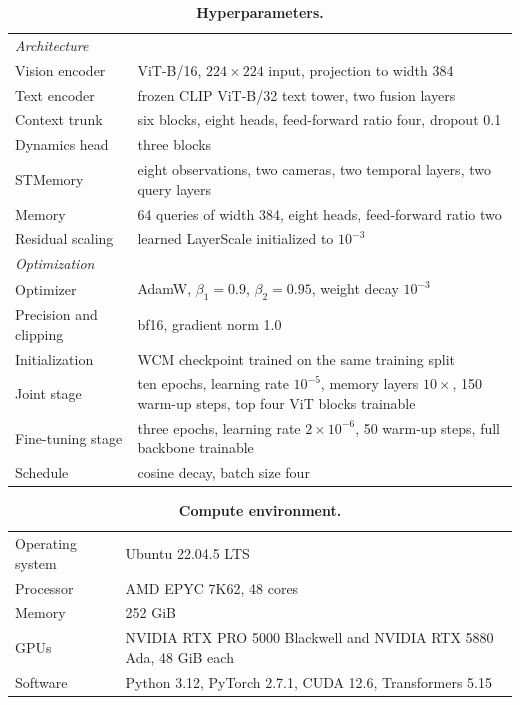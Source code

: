 \documentclass[10pt,a4paper]{article}
\begin{document}
\begin{table}[H]
\centering
\caption{\textbf{Hyperparameters.}}
\label{tab:hyper}
\small
\begin{tabular}{lp{11.2cm}}
\toprule
\multicolumn{2}{l}{\emph{Architecture}} \\
Vision encoder & ViT-B/16, $224\times224$ input, projection to width 384 \\
Text encoder & frozen CLIP ViT-B/32 text tower, two fusion layers \\
Context trunk & six blocks, eight heads, feed-forward ratio four, dropout 0.1 \\
Dynamics head & three blocks \\
STMemory & eight observations, two cameras, two temporal layers, two query layers \\
Memory & 64 queries of width 384, eight heads, feed-forward ratio two \\
Residual scaling & learned LayerScale initialized to $10^{-3}$ \\
\midrule
\multicolumn{2}{l}{\emph{Optimization}} \\
Optimizer & AdamW, $\beta_1=0.9$, $\beta_2=0.95$, weight decay $10^{-3}$ \\
Precision and clipping & bf16, gradient norm 1.0 \\
Initialization & WCM checkpoint trained on the same training split \\
Joint stage & ten epochs, learning rate $10^{-5}$, memory layers $10\times$, 150 warm-up steps, top four ViT blocks trainable \\
Fine-tuning stage & three epochs, learning rate $2\times10^{-6}$, 50 warm-up steps, full backbone trainable \\
Schedule & cosine decay, batch size four \\
\bottomrule
\end{tabular}
\end{table}

\begin{table}[H]
\centering
\caption{\textbf{Compute environment.}}
\label{tab:env}
\small
\begin{tabular}{ll}
\toprule
Operating system & Ubuntu 22.04.5 LTS \\
Processor & AMD EPYC 7K62, 48 cores \\
Memory & 252 GiB \\
GPUs & NVIDIA RTX PRO 5000 Blackwell and NVIDIA RTX 5880 Ada, 48 GiB each \\
Software & Python 3.12, PyTorch 2.7.1, CUDA 12.6, Transformers 5.15 \\
\bottomrule
\end{tabular}
\end{table}
\end{document}

